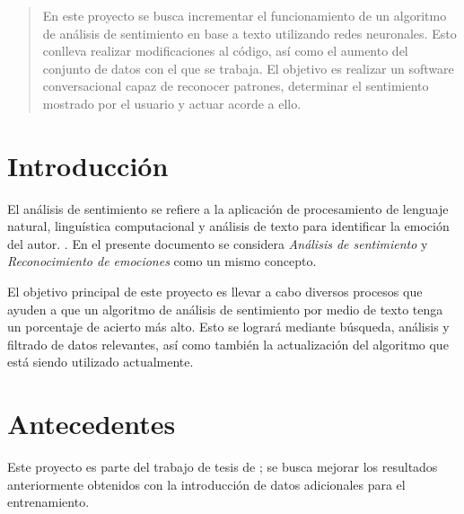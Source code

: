 \documentclass[a4]{sciposter}
\begin{document}
\maketitle

\begin{abstract}
En este proyecto se busca incrementar el funcionamiento de un algoritmo de análisis de sentimiento en base a texto utilizando redes neuronales. Esto conlleva realizar modificaciones al código, así como el aumento del conjunto de datos con el que se trabaja. El objetivo es realizar un software conversacional capaz de reconocer patrones, determinar el sentimiento mostrado por el usuario y actuar acorde a ello.
\end{abstract}

\begin{multicols}{3} 

\section{Introducción}
El análisis de sentimiento se refiere a la aplicación de procesamiento de lenguaje natural, linguística computacional y análisis de texto para identificar la emoción del autor. \citep{definition}. En el presente documento se considera \textit{Análisis de sentimiento} y \textit{Reconocimiento de emociones} como un mismo concepto.

El objetivo principal de este proyecto es llevar a cabo diversos procesos que ayuden a que un algoritmo de análisis de sentimiento por medio de texto tenga un porcentaje de acierto más alto. Esto se logrará mediante búsqueda, análisis y filtrado de datos relevantes, así como también la actualización del algoritmo que está siendo utilizado actualmente.

\section{Antecedentes}
Este proyecto es parte del trabajo de tesis de \citet{chatbot}; se busca mejorar los resultados anteriormente obtenidos con la introducción de datos adicionales para el entrenamiento.


\end{multicols}
\end{document}
